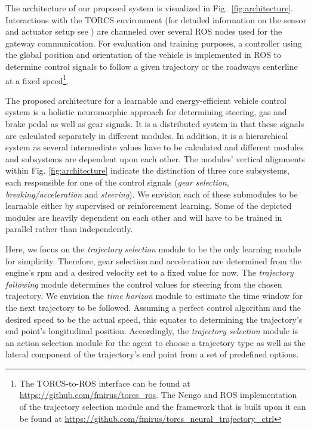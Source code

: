 The architecture of our proposed system is visualized in Fig.~\ref{fig:architecture}.
Interactions with the \ac{TORCS} environment (for detailed information on the sensor and actuator setup see \cite{Loiacono2010}) are channeled over several \ac{ROS} nodes used for the gateway communication.
For evaluation and training purposes, a controller using the global position and orientation of the vehicle is implemented in \ac{ROS} to determine control signals to follow a given trajectory or the roadways centerline at a fixed speed\footnote{The \ac{TORCS}-to-\ac{ROS} interface can be found at \url{https://github.com/fmirus/torcs_ros}.
The Nengo and \ac{ROS} implementation of the trajectory selection module and the framework that is built upon it can be found at \url{https://github.com/fmirus/torcs_neural_trajectory_ctrl}}.\par

The proposed architecture for a learnable and energy-efficient vehicle control system is a holistic neuromorphic approach for determining steering, gas and brake pedal as well as gear signals.
It is a distributed system in that these signals are calculated separately in different modules.
In addition, it is a hierarchical system as several intermediate values have to be calculated and different modules and subsystems are dependent upon each other.
The modules' vertical alignments within Fig. \ref{fig:architecture} indicate the distinction of three core subsystems, each responsible for one of the control signals (\emph{gear selection}, \emph{breaking/acceleration} and \emph{steering}).
We envision each of these submodules to be learnable either by supervised or reinforcement learning.
Some of the depicted modules are heavily dependent on each other and will have to be trained in parallel rather than independently. 

Here, we focus on the \emph{trajectory selection} module to be the only learning module for simplicity.
Therefore, gear selection and acceleration are determined from the engine's rpm and a desired velocity set to a fixed value for now.
The \emph{trajectory following} module determines the control values for steering from the chosen trajectory.
We envision the \emph{time horizon} module to estimate the time window for the next trajectory to be followed.
Assuming a perfect control algorithm and the desired speed to be the actual speed, this equates to determining the trajectory's end point's longitudinal position.
Accordingly, the \emph{trajectory selection} module is an action selection module for the agent to choose a trajectory type as well as the lateral component of the trajectory's end point from a set of predefined options.

